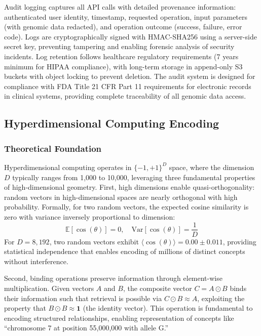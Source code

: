 \documentclass[11pt,letterpaper]{article}
\begin{document}
Audit logging captures all API calls with detailed provenance information: authenticated user identity, timestamp, requested operation, input parameters (with genomic data redacted), and operation outcome (success, failure, error code). Logs are cryptographically signed with HMAC-SHA256 using a server-side secret key, preventing tampering and enabling forensic analysis of security incidents. Log retention follows healthcare regulatory requirements (7 years minimum for HIPAA compliance), with long-term storage in append-only S3 buckets with object locking to prevent deletion. The audit system is designed for compliance with FDA Title 21 CFR Part 11 requirements for electronic records in clinical systems, providing complete traceability of all genomic data access.

\subsection{Hyperdimensional Computing Encoding}

\subsubsection{Theoretical Foundation}

Hyperdimensional computing operates in $\{-1,+1\}^D$ space, where the dimension $D$ typically ranges from 1,000 to 10,000, leveraging three fundamental properties of high-dimensional geometry. First, high dimensions enable quasi-orthogonality: random vectors in high-dimensional spaces are nearly orthogonal with high probability. Formally, for two random vectors, the expected cosine similarity is zero with variance inversely proportional to dimension:
\begin{equation}
\mathbb{E}[\cos(\theta)] = 0, \quad \text{Var}[\cos(\theta)] = \frac{1}{D}
\end{equation}
For $D=8,192$, two random vectors exhibit $\langle\cos(\theta)\rangle = 0.00 \pm 0.011$, providing statistical independence that enables encoding of millions of distinct concepts without interference.

Second, binding operations preserve information through element-wise multiplication. Given vectors $A$ and $B$, the composite vector $C = A \odot B$ binds their information such that retrieval is possible via $C \odot B \approx A$, exploiting the property that $B \odot B \approx \mathbf{1}$ (the identity vector). This operation is fundamental to encoding structured relationships, enabling representation of concepts like ``chromosome 7 at position 55,000,000 with allele G.''
\end{document}
